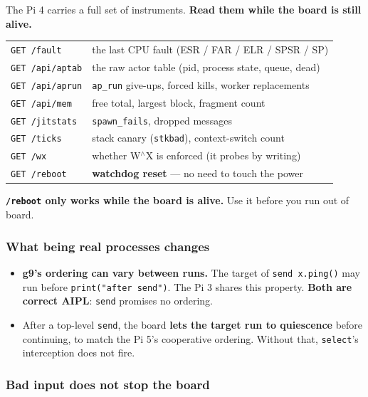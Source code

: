 \documentclass[11pt,a4paper]{article}
\begin{document}
The Pi 4 carries a full set of instruments. \textbf{Read them while the board is
still alive.}

\begin{center}
\small
\begin{tabular}{@{}ll@{}}
\toprule
\texttt{GET /fault} & the last CPU fault (ESR / FAR / ELR / SPSR / SP) \\
\texttt{GET /api/aptab} & the raw actor table (pid, process state, queue, dead) \\
\texttt{GET /api/aprun} & \texttt{ap\_run} give-ups, forced kills, worker replacements \\
\texttt{GET /api/mem} & free total, largest block, fragment count \\
\texttt{GET /jitstats} & \texttt{spawn\_fails}, dropped messages \\
\texttt{GET /ticks} & stack canary (\texttt{stkbad}), context-switch count \\
\texttt{GET /wx} & whether W$^\wedge$X is enforced (it probes by writing) \\
\texttt{GET /reboot} & \textbf{watchdog reset} --- no need to touch the power \\
\bottomrule
\end{tabular}
\end{center}

\textbf{\texttt{/reboot} only works while the board is alive.} Use it before you
run out of board.

\subsubsection*{What being real processes changes}

\begin{itemize}
\item \textbf{g9's ordering can vary between runs.} The target of
  \texttt{send x.ping()} may run before \texttt{print("after send")}. The Pi 3
  shares this property. \textbf{Both are correct AIPL}: \texttt{send} promises
  no ordering.
\item After a top-level \texttt{send}, the board \textbf{lets the target run to
  quiescence} before continuing, to match the Pi 5's cooperative ordering.
  Without that, \texttt{select}'s interception does not fire.
\end{itemize}

\subsubsection*{Bad input does not stop the board}
\end{document}
